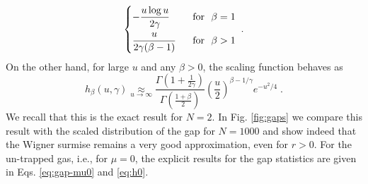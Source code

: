 \documentclass[onecolumn,superscriptaddress,
 amsmath,amssymb,
 aps,
 prd,
]{revtex4-1}
\begin{document}
{\begin{equation}
\begin{dcases}
 - \frac{u \log u}{2 \gamma} & \mbox{~~for~~} \beta = 1 \\
\frac{u}{2 \gamma (\beta - 1)} &\mbox{~~for~~} \beta > 1
\end{dcases} \;.
\end{equation}
On the other hand, for large $u$ and any $\beta>0$, the scaling function behaves as
%
\begin{equation} \label{eq:main-h-asymptotics-large-z}
h_\beta(u, \gamma) \underset{u \to \infty}\approx \frac{\Gamma\left(1 + \frac{1}{2 \gamma}\right)}{\Gamma\left(\frac{1 + \beta}{2}\right)} \left(\frac{u}{2}\right)^{\beta - 1/\gamma} e^{-u^2/4} \;.
\end{equation}
We recall that this is the exact result for $N=2$. In Fig. \ref{fig:gaps} we compare this result with the scaled distribution of the gap for $N=1000$ and show indeed that the Wigner surmise remains a very good approximation, even for $r>0$. For the un-trapped gas, i.e., for $\mu =0$, the explicit results for the gap statistics are given in Eqs. \eqref{eq:gap-mu0} and \eqref{eq:h0}.




}
\end{document}
